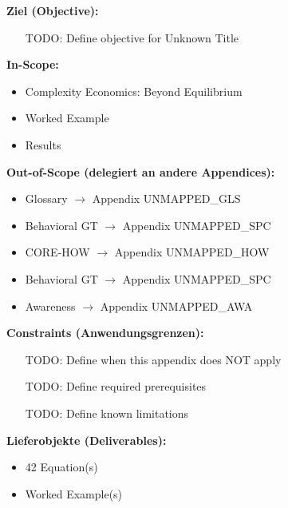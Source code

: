 
\begin{tcolorbox}[
    colback=orange!5!white,
    colframe=orange!75!black,
    title={\textbf{Appendix Scope: Ziel / In-Scope / Out-of-Scope / Constraints}},
    fonttitle=\bfseries
]

\textbf{Ziel (Objective):}
\begin{itemize}[nosep]
    \item [TODO: Define objective for Unknown Title]
\end{itemize}

\textbf{In-Scope:}
\begin{itemize}[nosep]
    \item Complexity Economics: Beyond Equilibrium
    \item Worked Example
    \item Results
\end{itemize}

\textbf{Out-of-Scope (delegiert an andere Appendices):}
\begin{itemize}[nosep]
    \item Glossary $\rightarrow$ Appendix UNMAPPED_GLS
    \item Behavioral GT $\rightarrow$ Appendix UNMAPPED_SPC
    \item CORE-HOW $\rightarrow$ Appendix UNMAPPED_HOW
    \item Behavioral GT $\rightarrow$ Appendix UNMAPPED_SPC
    \item Awareness $\rightarrow$ Appendix UNMAPPED_AWA
\end{itemize}

\textbf{Constraints (Anwendungsgrenzen):}
\begin{itemize}[nosep]
    \item [TODO: Define when this appendix does NOT apply]
    \item [TODO: Define required prerequisites]
    \item [TODO: Define known limitations]
\end{itemize}

\textbf{Lieferobjekte (Deliverables):}
\begin{itemize}[nosep]
    \item 42 Equation(s)
    \item Worked Example(s)
\end{itemize}

\end{tcolorbox}


